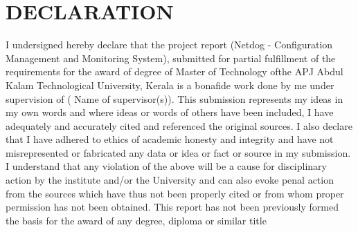\chapter*{\rm \large \bf DECLARATION}
\vspace{4.0mm}
\setlength{\parindent}{4em}
I undersigned hereby declare that the project report
(Netdog - Configuration Management and Monitoring System), submitted for partial
fulfillment of the requirements for the award of degree of Master of Technology
ofthe APJ Abdul Kalam Technological University, Kerala is a bonafide work done
by me under supervision of ( Name of supervisor(s)). This submission represents
my ideas in my own words and where ideas or words of others have been included,
I have adequately and accurately cited and referenced the original sources. I
also declare that I have adhered to ethics of academic honesty and integrity and
have not misrepresented or fabricated any data or idea or fact or source in my
submission. I understand that any violation of the above will be a cause for
disciplinary action by the institute and/or the University and can also evoke
penal action from the sources which have thus not been properly cited or from
whom proper permission has not been obtained. This report has not been
previously formed the basis for the award of any degree, diploma or similar
title
\newpage 
